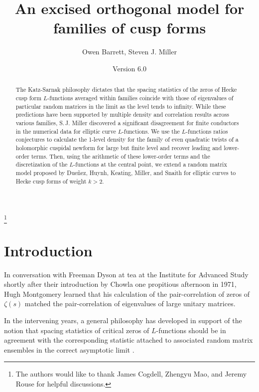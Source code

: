 \documentclass[11pt,reqno]{amsart} \usepackage{fullpage}
\numberwithin{equation}{section}
\begin{document}
\title{An excised orthogonal model for families of cusp forms}
\date{Version 6.0}
\author{Owen Barrett, Steven J. Miller}
\thanks{The authors would like to thank James Cogdell, Zhengyu Mao, and Jeremy Rouse for
helpful discussions.}
\begin{abstract}
  The Katz-Sarnak philosophy dictates that the spacing statistics of the zeros of
  Hecke cusp form $L$-functions averaged within families coincide with those of
  eigenvalues of particular random matrices in the limit as the level tends to infinity.
  While these predictions have been supported by multiple density and correlation results
  across various families, S.\,J. Miller discovered a significant disagreement for finite
  conductors in the numerical data for elliptic curve $L$-functions. We use the
  $L$-functions ratios conjectures to calculate the 1-level density for the family
  of even quadratic twists of a holomorphic cuspidal newform for large but finite level
  and recover leading and lower-order terms. Then, using the arithmetic of these
  lower-order terms and the discretization of the $L$-functions at the central point,
  we extend a random matrix model proposed by Dueñez, Huynh, Keating, Miller, and Snaith
  for elliptic curves to Hecke cusp forms of weight $k>2$.
\end{abstract}

\maketitle

\tableofcontents

\vspace{.25in}

\section{Introduction}
In conversation with Freeman Dyson at tea at the Institute for Advanced Study shortly after
their introduction by Chowla one propitious afternoon in 1971, Hugh Montgomery learned that
his calculation of the pair-correlation of zeros of $\zeta(s)$ matched the pair-correlation
of eigenvalues of large unitary matrices.

In the intervening years, a general philosophy has developed in support of the notion that
spacing statistics of critical zeros of $L$-functions should be in agreement with
the corresponding statistic attached to associated random matrix ensembles in the correct
asymptotic limit \cite{hejhal,RS,KaSa1,KaSa2,ILS}.
\end{document}
